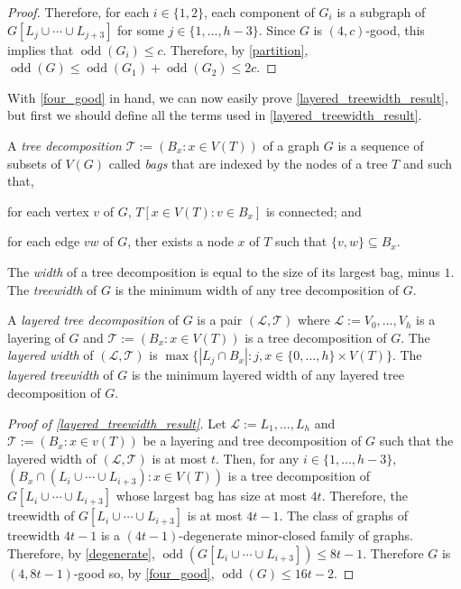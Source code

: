 \documentclass{patmorin}
\DeclareMathOperator{\odd}{odd}
\begin{document}
\begin{proof}
  Therefore, for each $i\in\{1,2\}$, each component of $G_i$ is a subgraph of $G[L_j\cup\cdots\cup L_{j+3}]$ for some $j\in\{1,\ldots,h-3\}$.  Since $G$ is $(4,c)$-good, this implies that $\odd(G_i)\le c$.  Therefore, by \cref{partition}, $\odd(G)\le \odd(G_1)+\odd(G_2)\le 2c$.
\end{proof}

With \cref{four_good} in hand, we can now easily prove \cref{layered_treewidth_result}, but first we should define all the terms used in \cref{layered_treewidth_result}.  

A \emph{tree decomposition} $\mathcal{T}:=(B_x:x\in V(T))$ of a graph $G$ is a sequence of subsets of $V(G)$ called \emph{bags} that are indexed by the nodes of a tree $T$ and such that, 
\begin{inparaenum}[(i)]
  \item for each vertex $v$ of $G$, $T[x\in V(T):v\in B_x]$ is connected; and
  \item for each edge $vw$ of $G$, ther exists a node $x$ of $T$ such that $\{v,w\}\subseteq B_x$.
\end{inparaenum}
The \emph{width} of a tree decomposition is equal to the size of its largest bag, minus $1$.  The \emph{treewidth} of $G$ is the minimum width of any tree decomposition of $G$.

A \emph{layered tree decomposition} of $G$ is a pair $(\mathcal{L},\mathcal{T})$ where $\mathcal{L}:=V_0,\ldots,V_h$ is a layering of $G$ and $\mathcal{T}:=(B_x:x\in V(T))$ is a tree decomposition of $G$.  The \emph{layered width} of $(\mathcal{L},\mathcal{T})$ is $\max\{|L_j\cap B_x|:j,x\in\{0,\ldots,h\}\times V(T)\}$.  The \emph{layered treewidth} of $G$ is the minimum layered width of any layered tree decomposition of $G$.

\begin{proof}[Proof of \cref{layered_treewidth_result}]
  Let $\mathcal{L}:=L_1,\ldots,L_h$ and $\mathcal{T}:=(B_x:x\in v(T))$ be a layering and tree decomposition of $G$ such that the layered width of $(\mathcal{L},\mathcal{T})$ is at most $t$.  Then, for any $i\in\{1,\ldots,h-3\}$, $(B_x\cap(L_i\cup\cdots\cup L_{i+3}):x\in V(T))$ is a tree decomposition of $G[L_i\cup\cdots\cup L_{i+3}]$ whose largest bag has size at most $4t$.  Therefore, the treewidth of $G[L_i\cup\cdots\cup L_{i+3}]$ is at most $4t-1$.  The class of graphs of treewidth $4t-1$ is a $(4t-1)$-degenerate minor-closed family of graphs.  Therefore, by \cref{degenerate}, $\odd(G[L_i\cup\cdots\cup L_{i+3}])\le 8t-1$.  Therefore $G$ is $(4,8t-1)$-good so, by \cref{four_good}, $\odd(G)\le 16t-2$.
\end{proof}
\end{document}
